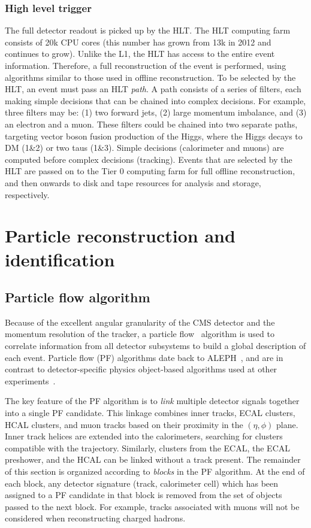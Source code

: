 \subsubsection{High level trigger}

The full detector readout is picked up by the HLT.
The HLT computing farm consists of 20k CPU cores (this number has grown from 13k in 2012 and continues to grow).
Unlike the L1, the HLT has access to the entire event information.
Therefore, a full reconstruction of the event is performed, using algorithms similar to those used in offline reconstruction.
To be selected by the HLT, an event must pass an HLT \emph{path}.
A path consists of a series of filters, each making simple decisions that can be chained into complex decisions.
For example, three filters may be: (1) two forward jets, (2) large momentum imbalance, and (3) an electron and a muon.
These filters could be chained into two separate paths, targeting vector boson fusion production of the Higgs, where the Higgs decays to DM (1\&2) or two taus (1\&3).
Simple decisions (calorimeter and muons) are computed before complex decisions (tracking).
Events that are selected by the HLT are passed on to the Tier 0 computing farm for full offline reconstruction, and then onwards to disk and tape resources for analysis and storage, respectively.



\section{Particle reconstruction and identification}

\subsection{Particle flow algorithm}

Because of the excellent angular granularity of the CMS detector and the momentum resolution of the tracker, a particle flow~\cite{cmspf} algorithm is used to correlate information from all detector subsystems to build a global description of each event.
Particle flow (PF) algorithms date back to ALEPH~\needcite, and are in contrast to detector-specific physics object-based algorithms used at other experiments~\needcite.

The key feature of the PF algorithm is to \emph{link} multiple detector signals together into a single PF candidate.
This linkage combines inner tracks, ECAL clusters, HCAL clusters, and muon tracks based on their proximity in the $(\eta,\phi)$ plane.
Inner track helices are extended into the calorimeters, searching for clusters compatible with the trajectory.
Similarly, clusters from the ECAL, the ECAL preshower, and the HCAL can be linked without a track present. 
The remainder of this section is organized according to \emph{blocks} in the PF algorithm.
At the end of each block, any detector signature (track, calorimeter cell) which has been assigned to a PF candidate in that block is removed from the set of objects passed to the next block.
For example, tracks associated with muons will not be considered when reconstructing charged hadrons. 

